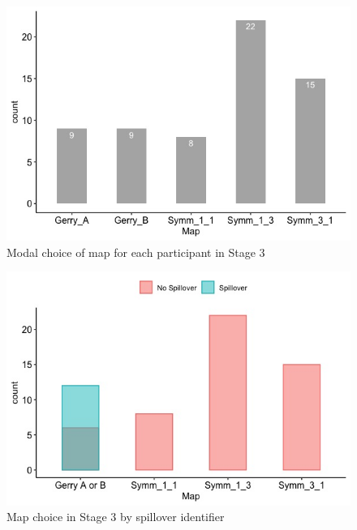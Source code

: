 \documentclass[AER]{AEA}
\begin{document}
\begin{figure}[h]
\centering
\includegraphics[scale=0.5]{map_choice_stage_3.jpeg}
\caption{Modal choice of map for each participant in Stage 3}
\label{fig:map_choice_stage_3}
\end{figure}

\begin{figure}[h]
\centering
\includegraphics[scale=0.5]{spillover_unadjusted.jpeg}
\caption{Map choice in Stage 3 by spillover identifier}
\label{fig:spillover_unadjusted}
\end{figure}
\end{document}
